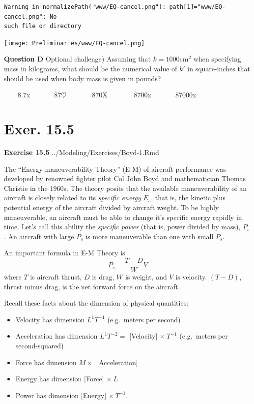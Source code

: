 \documentclass[
  letterpaper,
  DIV=11,
  numbers=noendperiod,
  oneside]{article}
\begin{document}
\begin{multicols}{2}
\begin{verbatim}
Warning in normalizePath("www/EQ-cancel.png"): path[1]="www/EQ-cancel.png": No
such file or directory
\end{verbatim}

\texttt{[image: Preliminaries/www/EQ-cancel.png]}

\textbf{Question D} Optional challenge) Assuming that
\(k = 1000 \text{cm}^2\) when specifying mass in kilograms, what should
be the numerical value of \(k'\) in square-inches that should be used
when body mass is given in pounds?

~~~~{8.7{x}}~~~~~~~{87{\(\heartsuit\ \)}}~~~~~~~{870{︎X
}}~~~~~~~{8700{x}}~~~~~~~{87000{x}}

\hypertarget{exer.-15.5}{%
\section*{Exer. 15.5}\label{exer.-15.5}}

\textbf{Exercise 15.5} ../Modeling/Exercises/Boyd-1.Rmd

The ``Energy-maneuverability Theory'' (E-M) of aircraft performance was
developed by renowned fighter pilot Col John Boyd and mathematician
Thomas Christie in the 1960s. The theory posits that the available
maneuverability of an aircraft is closely related to its \emph{specific
energy} \(E_s\), that is, the kinetic plus potential energy of the
aircraft divided by aircraft weight. To be highly maneuverable, an
aircraft must be able to change it's specific energy rapidly in time.
Let's call this ability the \emph{specific power} (that is, power
divided by mass), \(P_s\). An aircraft with large \(P_s\) is more
maneuverable than one with small \(P_s\).

An important formula in E-M Theory is \[P_s = \frac{T - D}{W} V\] where
\(T\) is aircraft thrust, \(D\) is drag, \(W\) is weight, and \(V\) is
velocity. \((T-D)\), thrust minus drag, is the net forward force on the
aircraft.

Recall these facts about the dimension of physical quantities:

\begin{itemize}
\item
  Velocity has dimension \(L^1 T^{-1}\) (e.g.~meters per second)
\item
  Acceleration has dimension \(L^1 T^{-2} =\) {[}Velocity{]}
  \(\times\  T^{-1}\) (e.g.~meters per second-squared)
\item
  Force has dimension \(M \times\ \) {[}Acceleration{]}
\item
  Energy has dimension {[}Force{]} \(\times\  L\)
\item
  Power has dimension {[}Energy{]} \(\times\  T^{-1}\).
\end{itemize}


\end{multicols}
\end{document}
